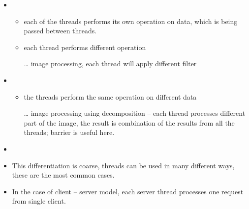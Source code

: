 \begin{slide}

\begin{itemize}
\item {}
\begin{itemize}
\item each of the threads performs its own operation on data,
which is being passed between threads.
\item each thread performs different operation
\item[\dots] image processing, each thread will apply different filter
\end{itemize}

\item {}
\begin{itemize}
\item the threads perform the same operation on different data
\item[\dots] image processing using decomposition -- each thread
processes different part of the image, the result is combination of
the results from all the threads; barrier is useful here.
\end{itemize}

\item {}
\end{itemize}
\end{slide}

\begin{itemize}
\item This differentiation is coarse, threads can be used in many different
ways, these are the most common cases.
\item In the case of client -- server model, each server thread processes
one request from single client.
\end{itemize}



